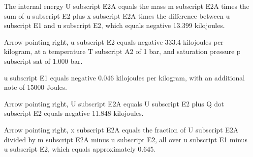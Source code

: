 The internal energy U subscript E2A equals the mass m subscript E2A times the sum of u subscript E2 plus x subscript E2A times the difference between u subscript E1 and u subscript E2, which equals negative 13.399 kilojoules.

Arrow pointing right, u subscript E2 equals negative 333.4 kilojoules per kilogram, at a temperature T subscript A2 of 1 bar, and saturation pressure p subscript sat of 1.000 bar.

u subscript E1 equals negative 0.046 kilojoules per kilogram, with an additional note of 15000 Joules.

Arrow pointing right, U subscript E2A equals U subscript E2 plus Q dot subscript E2 equals negative 11.848 kilojoules.

Arrow pointing right, x subscript E2A equals the fraction of U subscript E2A divided by m subscript E2A minus u subscript E2, all over u subscript E1 minus u subscript E2, which equals approximately 0.645.
